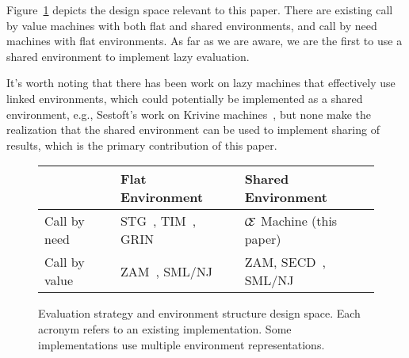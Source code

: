 Figure~\ref{fig:designspace} depicts the design space relevant to this paper.
There are existing call by value machines with both flat and shared
environments, and call by need machines with flat environments. As far as we are
aware, we are the first to use a shared environment to implement lazy
evaluation. 

It's worth noting that there has been work on lazy machines that effectively use
linked environments, which could potentially be implemented as a shared
environment, e.g., Sestoft's work on Krivine machines~\cite{sestoft}, but none
make the realization that the shared environment can be used to implement
sharing of results, which is the primary contribution of this paper.

\begin{figure}
\begin{tabularx}{\textwidth}{l | X | X}
                & Flat Environment     & Shared Environment \\ \hline
  Call by need  & STG~\cite{jonesstg}, 
                  TIM~\cite{TIM}, 
                  GRIN~\cite{boquist1997grin} 
                & $\mathcal{\mathcal{C} \mskip -4mu \mathcal{E}}$ Machine (this paper) \\
  Call by value & ZAM~\cite{leroy1990zinc}, 
                  SML/NJ~\cite{appel1991standard}
                & ZAM,
                  SECD~\cite{landin1964mechanical}, 
                  SML/NJ \\
\end{tabularx}
\caption{Evaluation strategy and environment structure design space. Each
acronym refers to an existing implementation. Some implementations use multiple
environment representations.}
\label{fig:designspace}
\end{figure}

